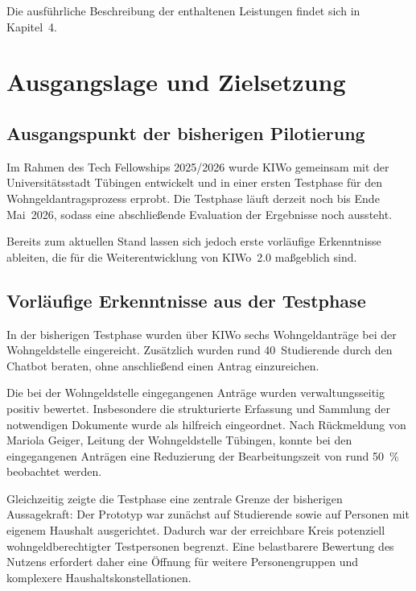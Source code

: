 \documentclass[11pt,a4paper,openany]{report}
\begin{document}
\medskip
Die ausführliche Beschreibung der enthaltenen Leistungen findet sich in
Kapitel~4.

\chapter{Ausgangslage und Zielsetzung}

\section{Ausgangspunkt der bisherigen Pilotierung}

Im Rahmen des Tech Fellowships 2025/2026 wurde KIWo gemeinsam mit der
Universitätsstadt Tübingen entwickelt und in einer ersten Testphase
für den Wohngeldantragsprozess erprobt. Die Testphase läuft derzeit
noch bis Ende Mai~2026, sodass eine abschließende Evaluation der
Ergebnisse noch aussteht.

Bereits zum aktuellen Stand lassen sich jedoch erste vorläufige
Erkenntnisse ableiten, die für die Weiterentwicklung von KIWo~2.0
maßgeblich sind.

\section{Vorläufige Erkenntnisse aus der Testphase}

In der bisherigen Testphase wurden über KIWo sechs Wohngeldanträge bei
der Wohngeldstelle eingereicht. Zusätzlich wurden rund 40~Studierende
durch den Chatbot beraten, ohne anschließend einen Antrag einzureichen.

Die bei der Wohngeldstelle eingegangenen Anträge wurden verwaltungsseitig
positiv bewertet. Insbesondere die strukturierte Erfassung und Sammlung
der notwendigen Dokumente wurde als hilfreich eingeordnet. Nach
Rückmeldung von Mariola Geiger, Leitung der Wohngeldstelle Tübingen,
konnte bei den eingegangenen Anträgen eine Reduzierung der
Bearbeitungszeit von rund 50~\% beobachtet werden.

Gleichzeitig zeigte die Testphase eine zentrale Grenze der bisherigen
Aussagekraft: Der Prototyp war zunächst auf Studierende sowie auf
Personen mit eigenem Haushalt ausgerichtet. Dadurch war der erreichbare
Kreis potenziell wohngeldberechtigter Testpersonen begrenzt. Eine
belastbarere Bewertung des Nutzens erfordert daher eine Öffnung für
weitere Personengruppen und komplexere Haushaltskonstellationen.
\end{document}
